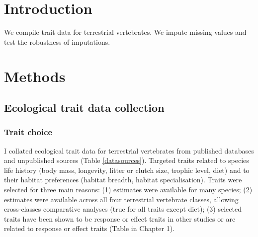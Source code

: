 \section{Introduction}
We compile trait data for terrestrial vertebrates. We impute missing values and test the robustness of imputations.


\section{Methods}

\subsection{Ecological trait data collection}

\subsubsection{Trait choice}
I collated ecological trait data for terrestrial vertebrates from published databases and unpublished sources (Table \ref{datasources}). Targeted traits related to species life history (body mass, longevity, litter or clutch size, trophic level, diet) and to their habitat preferences (habitat breadth, habitat specialisation). Traits were selected for three main reasons: (1) estimates were available for many species; (2) estimates were available across all four terrestrial vertebrate classes, allowing cross-classes comparative analyses (true for all traits except diet); (3) selected traits have been shown to be response or effect traits in other studies or are related to response or effect traits (Table in Chapter 1). 



